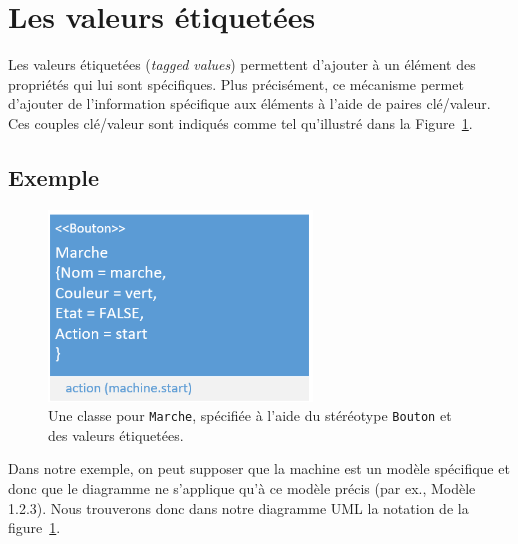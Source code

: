 
\section{Les valeurs \'etiquet\'ees}

Les valeurs \'etiquet\'ees (\emph{tagged values}) permettent d'ajouter \`a un \'el\'ement des propriétés qui lui sont spécifiques.
Plus pr\'ecis\'ement, ce m\'ecanisme permet d'ajouter de l'information spécifique aux éléments \`a l'aide de paires clé/valeur.
Ces couples clé/valeur sont indiqués comme tel qu'illustré dans la Figure~\ref{fig.uml_marche}.


\subsection*{Exemple}
%
\begin{figure}
    \begin{center}
    \includegraphics[width=7cm]{10_img/chap4/start.PNG}
    \caption{Une classe pour \texttt{Marche}, spécifiée à l'aide du stéréotype \texttt{Bouton} et des valeurs \'etiquet\'ees.}
    \label{fig.uml_marche}
    \end{center}
\end{figure}



Dans notre exemple, on peut supposer que la machine est un modèle spécifique et donc que le diagramme ne s'applique qu'à ce modèle précis (par ex., Modèle 1.2.3).
Nous trouverons donc dans notre diagramme UML la notation de la figure~\ref{fig.uml_marche}.

